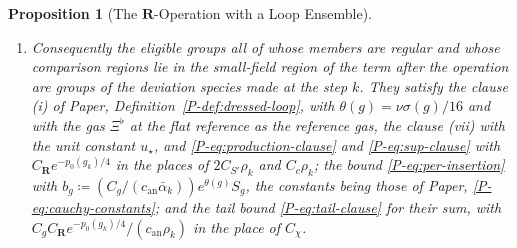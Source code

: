 \documentclass[11pt]{preprint}
\numberwithin{equation}{section}
\newtheorem{proposition}{Proposition}
\theoremstyle{definition}
\theoremstyle{remark}
\theoremstyle{plain}
\begin{document}
\begin{proposition}[The $\mathbf R$-Operation with a Loop Ensemble]
\begin{enumerate}[label=(\roman*)]
\begin{enumerate}[label=(\alph*)]
\begin{equation}\label{eq:r-production}
    \sum_ge^{\theta(g) + \frac{23}{16}\nu\sigma(g) + \frac{13}{8}\nu_e\operatorname{ext}(g)}S_g\,\ell_g \leq C_{\mathbf R}\,e^{-p_0(g_k)/4}\;,
\end{equation}
the sum over the free groups all of whose members are regular and which have $\Delta \subset X_g$ or $\mathfrak n \subset \mathrm{span}(g)$, with a constant $C_{\mathbf R}$ which depends on the constants of the construction, on $\Lambda_*$, and on $c_{\mathcal C}$; for the cross groups the norm is the projective one.
\item Consequently the eligible groups all of whose members are regular and whose comparison regions lie in the small-field region of the term after the operation are groups of the deviation species made at the step $k$. They satisfy the clause (i) of Paper, Definition~\ref{P-def:dressed-loop}, with $\theta(g) = \nu\sigma(g)/16$ and with the gas $\Xi^\flat$ at the flat reference as the reference gas, the clause (vii) with the unit constant $u_\star$, and \eqref{P-eq:production-clause} and \eqref{P-eq:sup-clause} with $C_{\mathbf R}e^{-p_0(g_k)/4}$ in the places of $2C_{S'}\rho_k$ and $C_c\rho_k$; the bound \eqref{P-eq:per-insertion} with $b_g \coloneqq (C_g/(c_{\mathrm{an}}\bar\alpha_k))e^{\theta(g)}S_g$, the constants being those of Paper, \eqref{P-eq:cauchy-constants}; and the tail bound \eqref{P-eq:tail-clause} for their sum, with $C_gC_{\mathbf R}e^{-p_0(g_k)/4}/(c_{\mathrm{an}}\rho_k)$ in the place of $C_\chi$.
\end{enumerate}

\end{enumerate}
\end{proposition}
\end{document}

